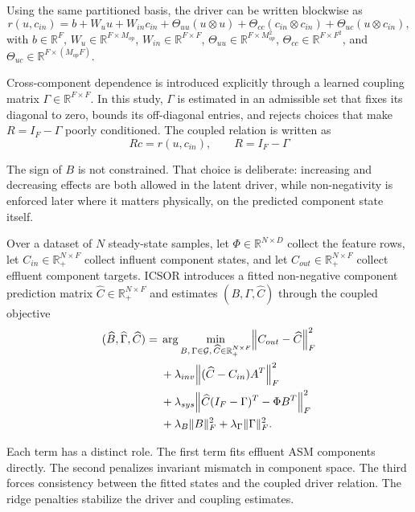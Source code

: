 \documentclass[11pt]{article}
\begin{document}
Using the same partitioned basis, the driver can be written blockwise as
\[
r(u, c_{in}) = b + W_u u + W_{in} c_{in} + \Theta_{uu}(u \otimes u) + \Theta_{cc}(c_{in} \otimes c_{in}) + \Theta_{uc}(u \otimes c_{in}),
\]
with $b \in \mathbb{R}^{F}$, $W_u \in \mathbb{R}^{F \times M_{op}}$, $W_{in} \in \mathbb{R}^{F \times F}$, $\Theta_{uu} \in \mathbb{R}^{F \times M_{op}^2}$, $\Theta_{cc} \in \mathbb{R}^{F \times F^2}$, and $\Theta_{uc} \in \mathbb{R}^{F \times (M_{op}F)}$.

Cross-component dependence is introduced explicitly through a learned coupling matrix $\Gamma \in \mathbb{R}^{F \times F}$. In this study, $\Gamma$ is estimated in an admissible set that fixes its diagonal to zero, bounds its off-diagonal entries, and rejects choices that make $R = I_F - \Gamma$ poorly conditioned. The coupled relation is written as
\begin{equation}
R c = r(u, c_{in}), \qquad R = I_F - \Gamma
\end{equation}

The sign of $B$ is not constrained. That choice is deliberate: increasing and decreasing effects are both allowed in the latent driver, while non-negativity is enforced later where it matters physically, on the predicted component state itself.

Over a dataset of $N$ steady-state samples, let $\Phi \in \mathbb{R}^{N \times D}$ collect the feature rows, let $C_{in} \in \mathbb{R}_{+}^{N \times F}$ collect influent component states, and let $C_{out} \in \mathbb{R}_{+}^{N \times F}$ collect effluent component targets. ICSOR introduces a fitted non-negative component prediction matrix $\widehat{C} \in \mathbb{R}_{+}^{N \times F}$ and estimates $(B, \Gamma, \widehat{C})$ through the coupled objective
\[
\begin{aligned}
(\widehat{B}, \widehat{\Gamma}, \widehat{C}) = {}&
\arg\min_{B,\, \Gamma \in \mathcal{G},\, \widehat{C} \in \mathbb{R}_{+}^{N \times F}}
\Bigl\|
C_{out} - \widehat{C}
\Bigr\|_F^2 \\
&+ \lambda_{inv}
\Bigl\|
(\widehat{C} - C_{in})A^T
\Bigr\|_F^2 \\
&+ \lambda_{sys}
\Bigl\|
\widehat{C}(I_F - \Gamma)^T - \Phi B^T
\Bigr\|_F^2 \\
&+ \lambda_B \|B\|_F^2
+ \lambda_\Gamma \|\Gamma\|_F^2.
\end{aligned}
\]

Each term has a distinct role. The first term fits effluent ASM components directly. The second penalizes invariant mismatch in component space. The third forces consistency between the fitted states and the coupled driver relation. The ridge penalties stabilize the driver and coupling estimates.
\end{document}
